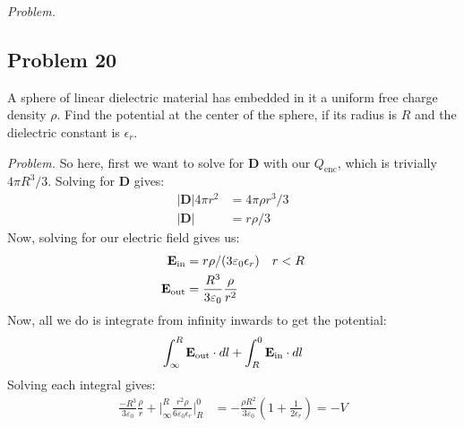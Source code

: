 \documentclass[10pt,oneside]{book}
\newcommand{\gspc}{\vspace{0.13cm}} %
\newenvironment{problem}[1]
  {\vspace{-0.1cm}\begin{tcolorbox}[problembox]
   \textit{Problem. }#1}
  {\end{tcolorbox}\gspc}
\newcommand{\cpr}[1]{\left(#1\right)}
\begin{document}
\begin{problem}
\end{problem}

\subsection*{Problem 20}
A sphere of linear dielectric material has embedded in it a uniform free charge density $\rho$. Find the potential at the center of the sphere, if its radius is $R$ and the dielectric constant is $\epsilon_r$. 
\begin{problem}
  So here, first we want to solve for $\mathbf D$ with our $Q_\text{enc}$, which is trivially $4\pi R^3/3$. Solving for $\mathbf D$ gives:
  \begin{align*}
    |\mathbf D |4\pi r^2&= 4\pi \rho r^3/3\\
    |\mathbf D | &= r\rho/3
  \end{align*}
  Now, solving for our electric field gives us:
  \begin{align*}
    {\mathbf{E}}_\text{in} &= r\rho/(3\varepsilon_0 \epsilon_r)\quad r< R\\
    {\mathbf{E}}_\text{out} &= \frac{R^3}{3\varepsilon_0}\frac{\rho}{r^2}
  \end{align*}
  Now, all we do is integrate from infinity inwards to get the potential:
  \begin{align*}
    \int_\infty^R {\mathbf{E}}_\text{out}\cdot dl + \int_R^0 {\mathbf{E}}_\text{in}\cdot dl
  \end{align*}
  Solving each integral gives:
  \begin{align*}
    \frac{-R^3}{3\varepsilon_0}\frac{\rho}{r}+\Bigg|_\infty^R\frac{r^2\rho}{6\varepsilon_0\epsilon_r}\Bigg|_R^0 &= -\frac{\rho R^2}{3\varepsilon_0}\cpr{1+\frac{1}{2\epsilon_r}}=-V
  \end{align*}
\end{problem}
\end{document}
